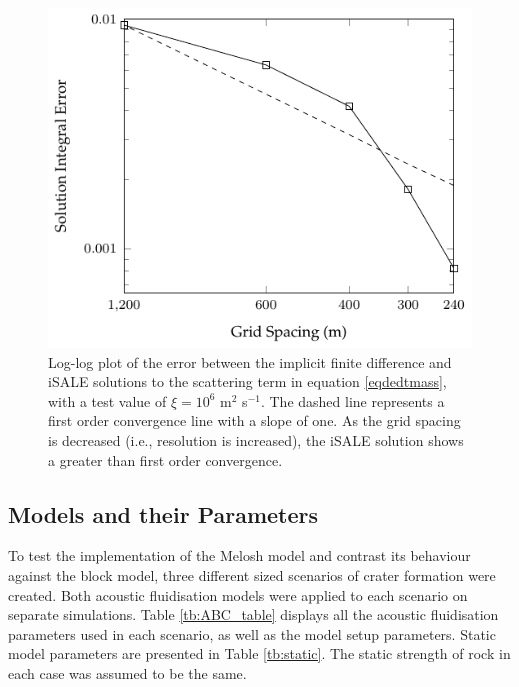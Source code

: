 \begin{figure}[!ht]
		\centering
		\includegraphics[width=\linewidth]{./images/scatter_test2.pdf}
		\caption{Log-log plot of the error between the implicit finite difference and iSALE solutions to the scattering term in equation \ref{eqdedtmass}, with a test value of $\xi=10^{6}$ m$^2$ s$^{-1}$. The dashed line represents a first order convergence line with a slope of one. As the grid spacing is decreased (i.e., resolution is increased), the iSALE solution shows a greater than first order convergence.\label{fig:scatter_test}}
\end{figure}\vspace{-0.3cm}

\subsection{Models and their Parameters}\label{sec:parameters}

To test the implementation of the Melosh model and contrast its behaviour against the block model, three different sized scenarios of crater formation were created. Both acoustic fluidisation models were applied to each scenario on separate simulations. Table \ref{tb:ABC_table} displays all the acoustic fluidisation parameters used in each scenario, as well as the model setup parameters. Static model parameters are presented in Table \ref{tb:static}. The static strength of rock in each case was assumed to be the same.



